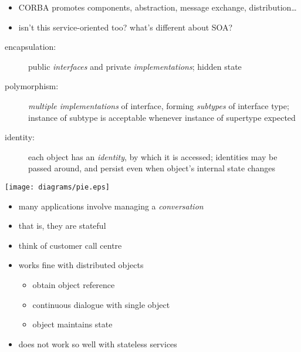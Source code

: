 \documentclass{sepslide-soa-faked} %
\begin{document}

\begin{slide}
\begin{itemize}
\item CORBA promotes components, abstraction, message exchange, distribution\ldots
\item isn't this service-oriented too? what's different about SOA?
\end{itemize}
\end{slide}

\begin{slide}
\begin{minipage}{0.6\textwidth} \raggedright
\begin{description}
\item[encapsulation:] public \emph{interfaces} and private
  \emph{implementations}; hidden state
\item[polymorphism:] \emph{multiple implementations} of interface,
  forming \emph{subtypes} of interface type;
  instance of subtype is acceptable whenever instance of supertype expected
\item[identity:] each object has an \emph{identity}, by which it is
  accessed; identities may be passed around, and persist even
  when object's internal state changes
\end{description}
\end{minipage}\quad\begin{minipage}{0.35\textwidth}
\texttt{[image: diagrams/pie.eps]}
\end{minipage}
\end{slide}

\begin{slide}
\begin{itemize}
\item many applications involve managing a \emph{conversation}
\item that is, they are stateful
\item think of customer call centre
\item works fine with distributed objects
\begin{itemize}
\item obtain object reference
\item continuous dialogue with single object
\item object maintains state
\end{itemize}
\item does not work so well with stateless services
\end{itemize}
\end{slide}
\end{document}
